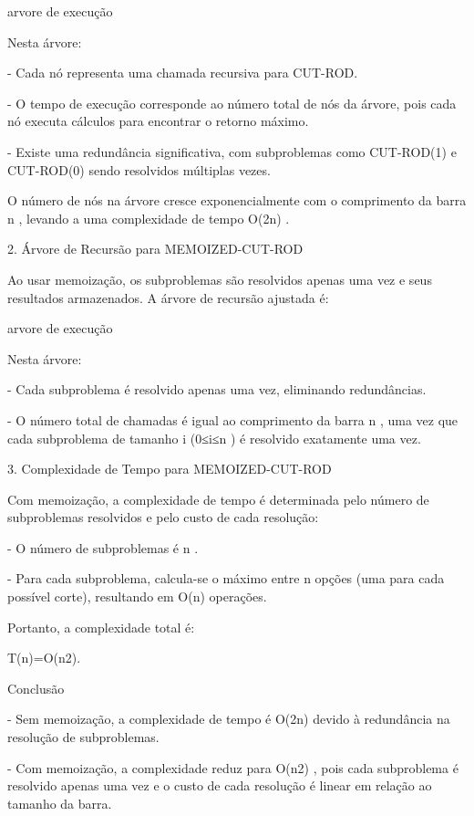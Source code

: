 arvore de execução

Nesta árvore:

- Cada nó representa uma chamada recursiva para CUT-ROD.

- O tempo de execução corresponde ao número total de nós da árvore, pois cada nó executa cálculos para encontrar o retorno máximo.

- Existe uma redundância significativa, com subproblemas como CUT-ROD(1) e CUT-ROD(0) sendo resolvidos múltiplas vezes.



O número de nós na árvore cresce exponencialmente com o comprimento da barra n
, levando a uma complexidade de tempo O(2n)
.



2. Árvore de Recursão para MEMOIZED-CUT-ROD

Ao usar memoização, os subproblemas são resolvidos apenas uma vez e seus resultados armazenados. A árvore de recursão ajustada é:

arvore de execução

Nesta árvore:

- Cada subproblema é resolvido apenas uma vez, eliminando redundâncias.


- O número total de chamadas é igual ao comprimento da barra n
, uma vez que cada subproblema de tamanho i
 (0≤i≤n
) é resolvido exatamente uma vez.



3. Complexidade de Tempo para MEMOIZED-CUT-ROD

Com memoização, a complexidade de tempo é determinada pelo número de subproblemas resolvidos e pelo custo de cada resolução:

- O número de subproblemas é n
.

- Para cada subproblema, calcula-se o máximo entre n
 opções (uma para cada possível corte), resultando em O(n)
 operações.



Portanto, a complexidade total é:

T(n)=O(n2).



Conclusão

- Sem memoização, a complexidade de tempo é O(2n)
 devido à redundância na resolução de subproblemas.

- Com memoização, a complexidade reduz para O(n2)
, pois cada subproblema é resolvido apenas uma vez e o custo de cada resolução é linear em relação ao tamanho da barra.

